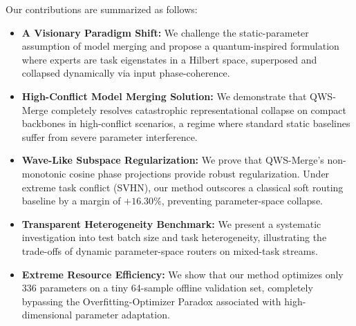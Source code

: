 Our contributions are summarized as follows:
\begin{itemize}
    \item \textbf{A Visionary Paradigm Shift:} We challenge the static-parameter assumption of model merging and propose a quantum-inspired formulation where experts are task eigenstates in a Hilbert space, superposed and collapsed dynamically via input phase-coherence.
    \item \textbf{High-Conflict Model Merging Solution:} We demonstrate that QWS-Merge completely resolves catastrophic representational collapse on compact backbones in high-conflict scenarios, a regime where standard static baselines suffer from severe parameter interference.
    \item \textbf{Wave-Like Subspace Regularization:} We prove that QWS-Merge's non-monotonic cosine phase projections provide robust regularization. Under extreme task conflict (SVHN), our method outscores a classical soft routing baseline by a margin of $+16.30\%$, preventing parameter-space collapse.
    \item \textbf{Transparent Heterogeneity Benchmark:} We present a systematic investigation into test batch size and task heterogeneity, illustrating the trade-offs of dynamic parameter-space routers on mixed-task streams.
    \item \textbf{Extreme Resource Efficiency:} We show that our method optimizes only 336 parameters on a tiny 64-sample offline validation set, completely bypassing the Overfitting-Optimizer Paradox associated with high-dimensional parameter adaptation.
\end{itemize}
